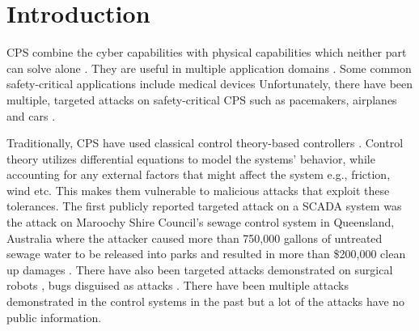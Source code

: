 
\chapter{Introduction }
\label{ch:Chapter1}
\ac{CPS} combine the cyber capabilities with physical capabilities which neither part can solve alone \cite{Platzer18}. They are useful in multiple application domains \cite{10.1145/2038642.2038685}\cite{10.1145/1837274.1837463} \cite{6051465}.
Some common safety-critical applications include medical devices \cite{10.1145/2038642.2038667} \cite{6051465} \cite{10.1145/2461328.2461369} \cite{Bresolin2015} %
Unfortunately, there have been multiple, targeted attacks on safety-critical CPS such as pacemakers\cite{4531149}, airplanes \cite{217595} and  cars \cite{10.5555/1929820.1929848}.


Traditionally, CPS have used classical control theory-based controllers  \cite{1337806} \cite{10.1145/2038642.2038667} \cite{6051465}. Control theory utilizes differential equations to model the systems' behavior, while accounting for any external factors that might affect the system e.g., friction, wind etc. This makes them vulnerable to malicious attacks that exploit these tolerances.
The first publicly reported targeted attack on a SCADA system \cite{article22} was the attack on Maroochy Shire Council’s sewage control system in Queensland, Australia where the attacker caused more than 750,000 gallons of untreated sewage water to be released into parks and resulted in more than \$200,000 clean up damages \cite{10.1016/j.adhoc.2009.04.012}. There have also been targeted attacks demonstrated on surgical robots \cite{7579758}, bugs disguised as attacks \cite{242054}. There have been multiple attacks demonstrated in the control systems in the past but a lot of the attacks have no public information\cite{doi:10.1080/13518040590969785}.
%

